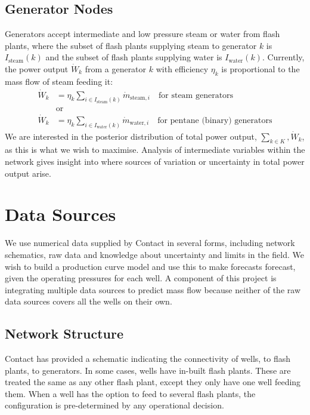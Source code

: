 \documentclass[a4paper, 12pt]{article}
\begin{document}
\subsection{Generator Nodes}
Generators accept intermediate and low pressure steam or water from flash plants, where the subset of flash plants supplying steam to generator $k$ is $I_{\text{steam}}(k)$ and the subset of flash plants supplying water is $I_{\text{water}}(k)$. Currently, the power output $\dot{W}_k$ from a generator $k$ with efficiency $\eta_k$ is proportional to the mass flow of steam feeding it:
\begin{align}
\dot{W}_k &= \eta_k \sum_{i\in I_{\text{steam}}(k)} \dot{m}_{\text{steam},i}\quad\text{for steam generators}\\
&\text{or}\nonumber\\
\dot{W}_k &= \eta_k \sum_{i\in I_{\text{water}}(k)} \dot{m}_{\text{water},i}\quad\text{for pentane (binary) generators} \label{eq:power}
\end{align}
We are interested in the posterior distribution of total power output, $\sum_{k\in K}, \dot{W}_k$, as this is what we wish to maximise. Analysis of intermediate variables within the network gives insight into where sources of variation or uncertainty in total power output arise.

\section{Data Sources}
We use numerical data supplied by Contact in several forms, including network schematics, raw data and knowledge about uncertainty and limits in the field. We wish to build a production curve model and use this to make forecasts forecast, given the operating pressures for each well. A component of this project is integrating multiple data sources to predict mass flow because neither of the raw data sources covers all the wells on their own.

\subsection{Network Structure}
Contact has provided a schematic indicating the connectivity of wells, to flash plants, to generators. In some cases, wells have in-built flash plants. These are treated the same as any other flash plant, except they only have one well feeding them. When a well has the option to feed to several flash plants, the configuration is pre-determined by any operational decision.
\end{document}
